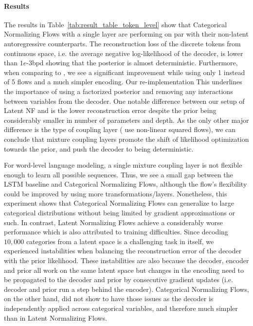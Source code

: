 \paragraph{Results} The results in Table~\ref{tab:result_table_token_level} show that Categorical Normalizing Flows with a single layer are performing on par with their non-latent autoregressive counterparts. 
The reconstruction loss of the discrete tokens from continuous space, i.e. the average negative log-likelihood of the decoder, is lower than $1e$-$3$bpd showing that the posterior is almost deterministic. 
Furthermore, when comparing to \citet{SemiDiscreteNFSequence}, we see a significant improvement while using only 1 instead of 5 flows and a much simpler encoding.
Our re-implementation 
This underlines the importance of using a factorized posterior and removing any interactions between variables from the decoder. 
One notable difference between our setup of Latent NF and \citet{SemiDiscreteNFSequence} is the lower reconstruction error despite the prior being considerably smaller in number of parameters and depth. 
As the only other major difference is the type of coupling layer (\citet{SemiDiscreteNFSequence} use non-linear squared flows), we can conclude that mixture coupling layers promote the shift of likelihood optimization towards the prior, and push the decoder to being deterministic.

For word-level language modeling, a single mixture coupling layer is not flexible enough to learn all possible sequences.
Thus, we see a small gap between the LSTM baseline and Categorical Normalizing Flows, although the flow's flexibility could be improved by using more transformations/layers.
Nonetheless, this experiment shows that Categorical Normalizing Flows can generalize to large categorical distributions without being limited by gradient approximations or such.
In contrast, Latent Normalizing Flows achieve a considerably worse performance which is also attributed to training difficulties. 
Since decoding $10,000$ categories from a latent space is a challenging task in itself, we experienced instabilities when balancing the reconstruction error of the decoder with the prior likelihood.
These instabilities are also because the decoder, encoder and prior all work on the same latent space but changes in the encoding need to be propagated to the decoder and prior by consecutive gradient updates (i.e. decoder and prior run a step behind the encoder).
Categorical Normalizing Flows, on the other hand, did not show to have those issues as the decoder is independently applied across categorical variables, and therefore much simpler than in Latent Normalizing Flows.

